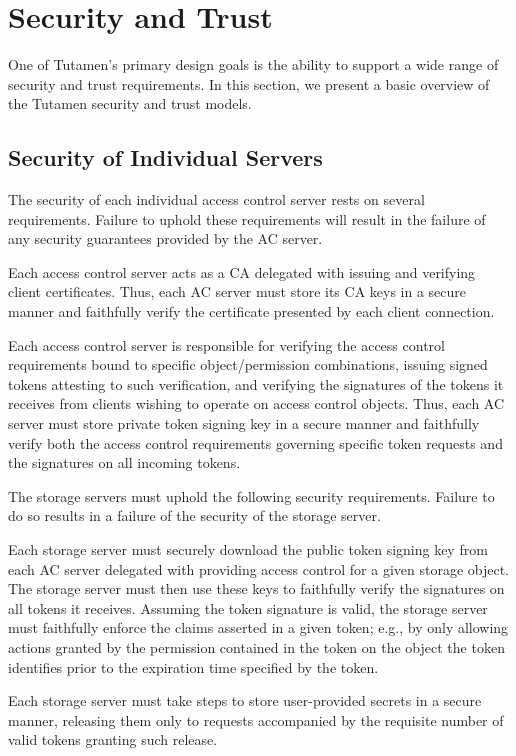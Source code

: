 \section{Security and Trust}
\label{sec:trust}

One of Tutamen's primary design goals is the ability to support a wide
range of security and trust requirements. In this section, we present
a basic overview of the Tutamen security and trust models.

\subsection{Security of Individual Servers}

The security of each individual access control server rests on several
requirements. Failure to uphold these requirements will result in the
failure of any security guarantees provided by the AC server.

\begin{packed_desc}
\item[Certificate Authority Role:] Each access control server acts as
  a CA delegated with issuing and verifying client certificates. Thus,
  each AC server must store its CA keys in a secure manner and
  faithfully verify the certificate presented by each client
  connection.
\item[Token Issuance and Verification:] Each access control server is
  responsible for verifying the access control requirements bound to
  specific object/permission combinations, issuing signed tokens
  attesting to such verification, and verifying the signatures of the
  tokens it receives from clients wishing to operate on access control
  objects. Thus, each AC server must store private token signing key
  in a secure manner and faithfully verify both the access control
  requirements governing specific token requests and the signatures on
  all incoming tokens.
\end{packed_desc}

The storage servers must uphold the following security
requirements. Failure to do so results in a failure of the security of
the storage server.

\begin{packed_desc}
\item[Token Verification:] Each storage server must securely download
  the public token signing key from each AC server delegated with
  providing access control for a given storage object. The storage
  server must then use these keys to faithfully verify the signatures
  on all tokens it receives. Assuming the token signature is valid,
  the storage server must faithfully enforce the claims asserted in a
  given token; e.g., by only allowing actions granted by the
  permission contained in the token on the object the token identifies
  prior to the expiration time specified by the token.
\item[Secure Storage:] Each storage server must take steps to store
  user-provided secrets in a secure manner, releasing them only to
  requests accompanied by the requisite number of valid tokens
  granting such release.
\end{packed_desc}

